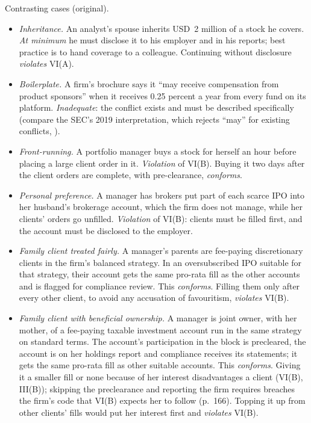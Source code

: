 \begin{qfrule}
 Contrasting cases (original).
\begin{itemize}
\item \emph{Inheritance.} An analyst's spouse inherits USD~2 million of a stock he covers. \emph{At minimum} he must disclose it to his employer and in his reports; best practice is to hand coverage to a colleague. Continuing without disclosure \emph{violates} VI(A).
\item \emph{Boilerplate.} A firm's brochure says it ``may receive compensation from product sponsors'' when it receives 0.25 percent a year from every fund on its platform. \emph{Inadequate}: the conflict exists and must be described specifically (compare the SEC's 2019 interpretation, which rejects ``may'' for existing conflicts, \citep[84 FR 33676]{sec-adviser-standard-of-conduct-2019}).
\item \emph{Front-running.} A portfolio manager buys a stock for herself an hour before placing a large client order in it. \emph{Violation} of VI(B). Buying it two days after the client orders are complete, with pre-clearance, \emph{conforms}.
\item \emph{Personal preference.} A manager has brokers put part of each scarce IPO into her husband's brokerage account, which the firm does not manage, while her clients' orders go unfilled. \emph{Violation} of VI(B): clients must be filled first, and the account must be disclosed to the employer.
\item \emph{Family client treated fairly.} A manager's parents are fee-paying discretionary clients in the firm's balanced strategy. In an oversubscribed IPO suitable for that strategy, their account gets the same pro-rata fill as the other accounts and is flagged for compliance review. This \emph{conforms}. Filling them only after every other client, to avoid any accusation of favouritism, \emph{violates} VI(B).
\item \emph{Family client with beneficial ownership.} A manager is joint owner, with her mother, of a fee-paying taxable investment account run in the same strategy on standard terms. The account's participation in the block is precleared, the account is on her holdings report and compliance receives its statements; it gets the same pro-rata fill as other suitable accounts. This \emph{conforms}. Giving it a smaller fill or none because of her interest disadvantages a client (VI(B), III(B)); skipping the preclearance and reporting the firm requires breaches the firm's code that VI(B) expects her to follow (p.~166). Topping it up from other clients' fills would put her interest first and \emph{violates} VI(B).

\end{itemize}
\end{qfrule}
